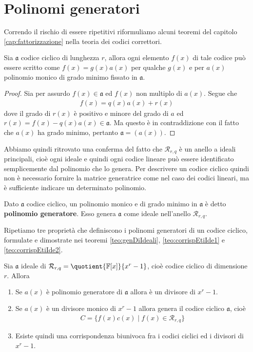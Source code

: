 \section{Polinomi generatori}

Correndo il rischio di essere ripetitivi riformuliamo alcuni teoremi del capitolo \ref{cap:fattorizzazione} nella teoria dei codici correttori.
\begin{teorema}
   Sia $\mathfrak{a}$ codice ciclico di lunghezza $r$, allora ogni elemento $f(x)$ di tale codice può essere scritto come 
   $f(x) = g(x)a(x)$ per qualche $g(x)$ e per $a(x)$ polinomio monico di grado minimo fissato in $\mathfrak{a}$.
\end{teorema}
\begin{proof}
   Sia per assurdo $f(x) \in \mathfrak{a}$ ed $f(x)$ non multiplo di $a(x)$. Segue che 
   \begin{align*}
      f(x) = q(x)a(x) + r(x)
   \end{align*}
   dove il grado di $r(x)$ è positivo e minore del grado di $a$ ed $r(x) = f(x) - q(x)a(x) \in \mathfrak{a}$. Ma questo è in contraddizione con il fatto che $a(x)$ ha grado minimo, pertanto $\mathfrak{a} = (a(x))$.
\end{proof}
\noindent
  Abbiamo quindi ritrovato una conferma del fatto che $\mathcal{R}_{r, q}$ è un anello a ideali principali, cioè ogni ideale e quindi ogni codice lineare può essere identificato semplicemente dal polinomio che lo genera. Per descrivere un codice ciclico quindi non è necessario fornire la matrice generatrice come nel caso dei codici lineari, ma è sufficiente indicare un determinato polinomio.
\begin{definizione}
   Dato $\mathfrak{a}$ codice ciclico, un polinomio monico e di grado minimo in $\mathfrak{a}$ è detto {\bf polinomio generatore}. Esso genera $\mathfrak{a}$ come ideale nell'anello $\mathcal{R}_{r, q}$. 
\end{definizione}
\noindent
Ripetiamo tre proprietà che definiscono i polinomi generatori di un codice ciclico, formulate e dimostrate nei teoremi \ref{teo:genDiIdeali}, \ref{teo:corrispEtiIde1} e \ref{teo:corrispEtiIde2}. 
\begin{teorema}
   Sia $\mathfrak{a}$ ideale di $\mathcal{R}_{r, q} = \quotient{\mathbb{F} \lbrack x \rbrack  }{ x^{r}- 1}$, cioè codice ciclico di dimensione $r$.  Allora
   \begin{enumerate}
      \item Se $a(x)$ è polinomio generatore di $\mathfrak{a}$ allora è un divisore di $x^r - 1$.
      \item Se $a(x)$ è un divisore monico di $x^r-1$ allora genera il codice ciclico $\mathfrak{a}$, cioè
      \begin{align*}
         C = \lbrace f(x)c(x) \mid f(x) \in \mathcal{R}_{r, q}  \rbrace
      \end{align*}
      \item Esiste quindi una corrispondenza biunivoca fra i codici ciclici ed i divisori di $x^r - 1$.
   \end{enumerate}
\end{teorema}
